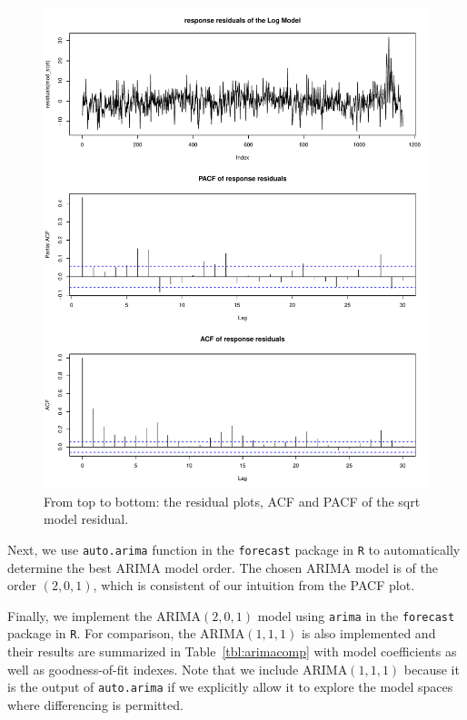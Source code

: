 \documentclass [11pt, proquest] {uwthesis}[2015/03/03]
\begin{document}
\begin{figure}
   \includegraphics[width=1\textwidth]{figures/residual_acfpcf} 
  \caption{From top to bottom: the residual plots, ACF and PACF of the sqrt model residual.}
  \label{fig:residual_acfpcf}
\end{figure}

Next, we use \texttt{auto.arima} function in the \texttt{forecast} package in \texttt{R} to automatically determine the best ARIMA model order. The chosen ARIMA model is of the order $(2,0,1)$, which is consistent of our intuition from the PACF plot. 

Finally, we implement the ARIMA$(2,0,1)$ model using \texttt{arima} in the \texttt{forecast} package in \texttt{R}. For comparison, the ARIMA$(1,1,1)$ is also implemented and their results are summarized in Table~\ref{tbl:arimacomp} with model coefficients as well as goodness-of-fit indexes. Note that we include ARIMA$(1,1,1)$ because it is the output of \texttt{auto.arima} if we explicitly allow it to explore the model spaces where differencing is permitted.
\end{document}
